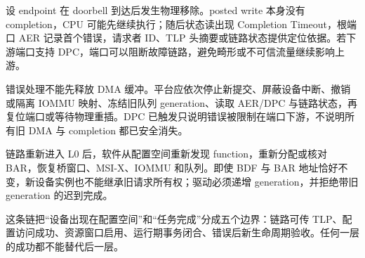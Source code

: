 
设 endpoint 在 doorbell 到达后发生物理移除。posted write 本身没有 completion，CPU 可能先继续执行；随后状态读出现 Completion Timeout，根端口 AER 记录首个错误，请求者 ID、TLP 头摘要或链路状态提供定位依据。若下游端口支持 DPC，端口可以阻断故障链路，避免畸形或不可信流量继续影响上游。

错误处理不能先释放 DMA 缓冲。平台应依次停止新提交、屏蔽设备中断、撤销或隔离 IOMMU 映射、冻结旧队列 generation、读取 AER/DPC 与链路状态，再复位端口或等待物理重插。DPC 已触发只说明错误被限制在端口下游，不说明所有旧 DMA 与 completion 都已安全消失。


链路重新进入 L0 后，软件从配置空间重新发现 function，重新分配或核对 BAR，恢复桥窗口、MSI-X、IOMMU 和队列。即使 BDF 与 BAR 地址恰好不变，新设备实例也不能继承旧请求所有权；驱动必须递增 generation，并拒绝带旧 generation 的迟到完成。

这条链把“设备出现在配置空间”和“任务完成”分成五个边界：链路可传 TLP、配置访问成功、资源窗口启用、运行期事务闭合、错误后新生命周期验收。任何一层的成功都不能替代后一层。
